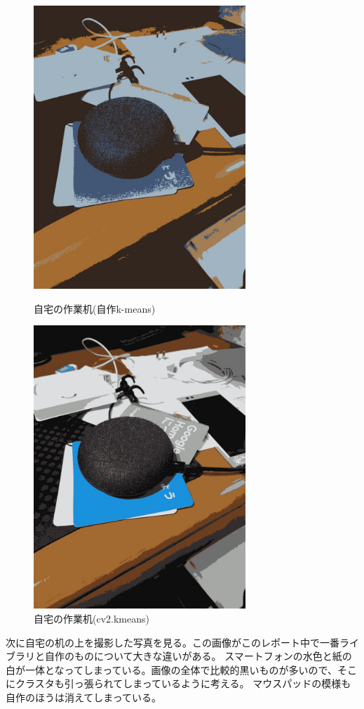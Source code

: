 \documentclass[11pt,a4j]{jsarticle}
\begin{document}
    \begin{figure}[htbp]
        \begin{minipage}{0.5\hsize}
         \begin{center}
          \includegraphics[width=80mm]{img/mydesk_result.jpg}
         \end{center}
         \caption{自宅の作業机(自作k-means)}
        \end{minipage}
        \begin{minipage}{0.5\hsize}
         \begin{center}
          \includegraphics[width=80mm]{img/mydesk_opencv.jpg}
         \end{center}
         \caption{自宅の作業机(cv2.kmeans)}
        \end{minipage}
    \end{figure} 
    次に自宅の机の上を撮影した写真を見る。この画像がこのレポート中で一番ライブラリと自作のものについて大きな違いがある。
    スマートフォンの水色と紙の白が一体となってしまっている。画像の全体で比較的黒いものが多いので、そこにクラスタも引っ張られてしまっているように考える。
    マウスパッドの模様も自作のほうは消えてしまっている。
    
\end{document}

